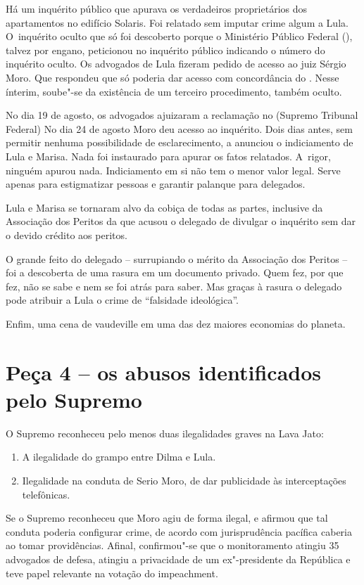 Há um inquérito público que apurava os verdadeiros proprietários dos
apartamentos no edifício Solaris. Foi relatado sem imputar crime algum a
Lula. O~inquérito oculto que só foi descoberto porque o Ministério
Público Federal (), talvez por engano, peticionou no inquérito
público indicando o número do inquérito oculto. Os advogados de Lula
fizeram pedido de acesso ao juiz Sérgio Moro. Que respondeu que só
poderia dar acesso com concordância do . Nesse ínterim, soube"-se da
existência de um terceiro procedimento, também oculto.

No dia 19 de agosto, os advogados ajuizaram a reclamação no  (Supremo
Tribunal Federal) No dia 24 de agosto Moro deu acesso ao inquérito. Dois
dias antes, sem permitir nenhuma possibilidade de esclarecimento, a 
anunciou o indiciamento de Lula e Marisa. Nada foi instaurado para
apurar os fatos relatados. A~rigor, ninguém apurou nada. Indiciamento em
si não tem o menor valor legal. Serve apenas para estigmatizar pessoas e
garantir palanque para delegados.

Lula e Marisa se tornaram alvo da cobiça de todas as partes, inclusive
da Associação dos Peritos da  que acusou o delegado de divulgar o
inquérito sem dar o devido crédito aos peritos.

O grande feito do delegado -- surrupiando o mérito da Associação dos
Peritos -- foi a descoberta de uma rasura em um documento privado. Quem
fez, por que fez, não se sabe e nem se foi atrás para saber. Mas graças
à rasura o delegado pode atribuir a Lula o crime de ``falsidade
ideológica''.

Enfim, uma cena de vaudeville em uma das dez maiores economias do
planeta.

\section{Peça 4 -- os abusos identificados pelo Supremo}

O Supremo reconheceu pelo menos duas ilegalidades graves na Lava Jato:

\begin{enumerate}
\itemsep1pt\parskip0pt
\item
  A ilegalidade do grampo entre Dilma e Lula.
\item
  Ilegalidade na conduta de Serio Moro, de dar publicidade às
  interceptações telefônicas.
\end{enumerate}

Se o Supremo reconheceu que Moro agiu de forma ilegal, e afirmou que tal
conduta poderia configurar crime, de acordo com jurisprudência pacífica
caberia ao  tomar providências. Afinal, confirmou"-se que o
monitoramento atingiu 35 advogados de defesa, atingiu a privacidade de
um ex"-presidente da República e teve papel relevante na votação do
impeachment.

